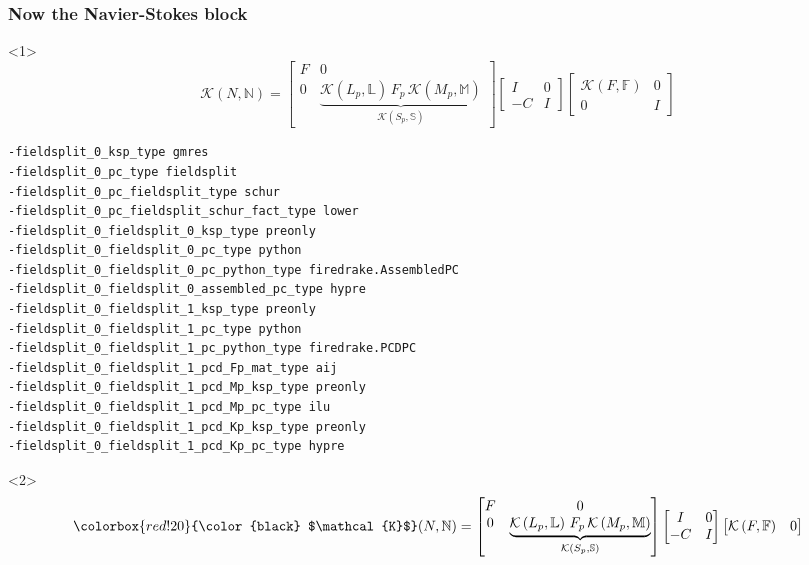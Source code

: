 \documentclass[presentation]{beamer}
\newcommand{\KSP}[2]{\ensuremath{\mathcal{K}\left(#1, \mathbb{#2}\right)}}
\newcommand{\ksp}[1]{\KSP{#1}{#1}}
\newcommand{\highlight}[1]{\colorbox{red!20}{\color{black} #1}}
\begin{document}
\begin{frame}[fragile]
  \frametitle{Now the Navier-Stokes block}
  \begin{onlyenv}<1>
    \begin{equation*}
      \mathcal{K}(N, \mathbb{N}) = \begin{bmatrix}
        F & 0 \\
        0 & \underbrace{\KSP{L_p}{L}\,F_p \, \KSP{M_p}{M}}_{\KSP{S_p}{S}}
      \end{bmatrix}
      \begin{bmatrix}
        I & 0\\
        -C & I
      \end{bmatrix}
      \begin{bmatrix}
        \ksp{F} & 0 \\
        0 & I
      \end{bmatrix}
    \end{equation*}
\begin{verbatim}
-fieldsplit_0_ksp_type gmres
-fieldsplit_0_pc_type fieldsplit
-fieldsplit_0_pc_fieldsplit_type schur
-fieldsplit_0_pc_fieldsplit_schur_fact_type lower
-fieldsplit_0_fieldsplit_0_ksp_type preonly
-fieldsplit_0_fieldsplit_0_pc_type python
-fieldsplit_0_fieldsplit_0_pc_python_type firedrake.AssembledPC
-fieldsplit_0_fieldsplit_0_assembled_pc_type hypre
-fieldsplit_0_fieldsplit_1_ksp_type preonly
-fieldsplit_0_fieldsplit_1_pc_type python
-fieldsplit_0_fieldsplit_1_pc_python_type firedrake.PCDPC
-fieldsplit_0_fieldsplit_1_pcd_Fp_mat_type aij
-fieldsplit_0_fieldsplit_1_pcd_Mp_ksp_type preonly
-fieldsplit_0_fieldsplit_1_pcd_Mp_pc_type ilu
-fieldsplit_0_fieldsplit_1_pcd_Kp_ksp_type preonly
-fieldsplit_0_fieldsplit_1_pcd_Kp_pc_type hypre
\end{verbatim}
  \end{onlyenv}
  \begin{onlyenv}<2>
    \color{gray}
    \begin{equation*}
      \highlight{$\mathcal{K}$}(N, \mathbb{N}) = \begin{bmatrix}
        F & 0 \\
        0 & \underbrace{\KSP{L_p}{L}\,F_p \, \KSP{M_p}{M}}_{\KSP{S_p}{S}}
      \end{bmatrix}
      \begin{bmatrix}
        I & 0\\
        -C & I
      \end{bmatrix}
      \begin{bmatrix}
        \ksp{F} & 0 \\

\end{bmatrix}
\end{equation*}
\end{onlyenv}
\end{frame}
\end{document}
